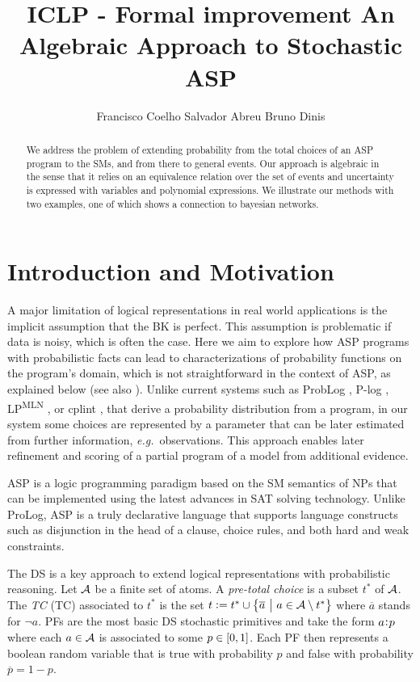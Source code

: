 \documentclass[adraft,copyright,creativecommons]{eptcs}
\title{\textbf{ICLP - Formal improvement} An Algebraic Approach to Stochastic ASP}
\author{Francisco Coelho \qquad Salvador Abreu \qquad Bruno Dinis
    \institute{Universidade de Évora\\ Évora, Portugal}
    \email{\{fc, spa, bruno.dinis\}@uevora.pt}
}
\newcommand{\co}[1]{\ensuremath{\overline{#1}}}
\newcommand{\fml}[1]{\ensuremath{{\cal #1}}}
\newcommand{\given}{\ensuremath{~\middle|~}}
\newcommand{\probfact}[2]{\ensuremath{#2\mkern-4mu:\mkern-4mu#1}}
\begin{document}
\maketitle

\begin{abstract}
    We address the problem of extending probability from the total choices of an \acs{ASP} program to the \aclp{SM}, and from there to general events.
    Our approach is algebraic in the sense that it relies on an equivalence relation over the set of events and uncertainty is expressed with variables and polynomial expressions.
    We illustrate our methods with two examples, one of which shows a connection to bayesian networks.
\end{abstract}

%
%
%
%
%
\section{Introduction and Motivation}
%
%
%
A major limitation of logical representations in real world applications is the implicit assumption that the \acl{BK} is perfect. This assumption is problematic if data is noisy, which is often the case. Here we aim to explore how \acl{ASP} programs with probabilistic facts can lead to characterizations of probability functions on the program's domain, which is not straightforward in the context of \acl{ASP}, as explained below (see also \cite{cozman2020joy,verreet2022inference,baral2009probabilistic,pajunen2021solution}). Unlike current systems such as ProbLog \cite{de2007problog}, P-log \cite{baral2009probabilistic}, LP\textsuperscript{MLN} \cite{lee2016weighted}, or cplint \cite{alberti2017cplint}, that derive a probability distribution from a program, in our system some choices are represented by a parameter that can be later estimated from further information, \emph{e.g.}\ observations. This approach enables later refinement and scoring of a partial program of a model from additional evidence.

\Ac{ASP} \cite{lifschitz2002answer} is a logic programming paradigm based on the \ac{SM} semantics of \acp{NP} that can be implemented using the latest advances in SAT solving technology. Unlike ProLog, \ac{ASP} is a truly declarative language that supports language constructs such as disjunction in the head of a clause, choice rules, and both hard and weak constraints.

The \ac{DS} \cite{sato1995statistical,riguzzi2022foundations} is a key approach to extend logical representations with probabilistic reasoning. 
%
Let $\fml{A}$ be a finite set of atoms. A \emph{pre-total choice} is a subset $t^{\ast}$ of \fml{A}. The \emph{\acl{TC}} (TC) associated to $t^{\ast}$ is the set $t := t^{\ast} \cup \set{\co{a} \given a \in \fml{A} \setminus t^{\ast}}$ where $\co{a}$ stands for $\neg a$. \Acp{PF} are the most basic \ac{DS} stochastic primitives and take the form  $\probfact{p}{a}$ where each $a\in\fml{A}$ is associated to some $p\in\intcc{0, 1}$. Each \ac{PF} then represents a boolean random variable that is true with probability $p$ and false with probability $\co{p} = 1 - p$.
\end{document}
